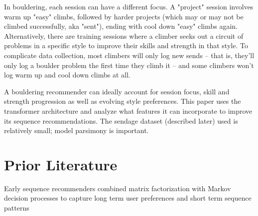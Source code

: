 \documentclass[10pt]{article}
\begin{document}
In bouldering, each session can have a different focus. A "project" session involves warm up "easy" climbs, followed by harder projects (which may or may not be climbed successfully, aka "sent"), ending with cool down "easy" climbs again. Alternatively, there are training sessions where a climber seeks out a circuit of problems in a specific style to improve their skills and strength in that style. To complicate data collection, most climbers will only log new sends -- that is, they'll only log a boulder problem the first time they climb it -- and some climbers won't log warm up and cool down climbs at all.

A bouldering recommender can ideally account for session focus, skill and strength progression as well as evolving style preferences. This paper uses the transformer architecture and analyze what features it can incorporate to improve its sequence recommendations. The sendage dataset (described later) used is relatively small; model parsimony is important. 






\section{Prior Literature}

Early sequence recommenders combined matrix factorization with Markov decision processes to capture long term user preferences and short term sequence patterns \cite{FPMC}
\end{document}
